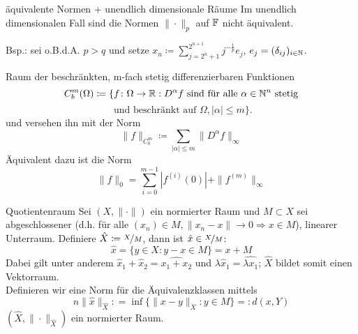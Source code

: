 	\begin{karte}{äquivalente Normen + unendlich dimensionale Räume}
		Im unendlich dimensionalen Fall sind die Normen $\| \cdot \|_{p}$ auf $\mathbb{F}$ nicht äquivalent.
		
		Bsp.: sei o.B.d.A. $p > q$ und setze $x_{n} \coloneqq \sum_{j = 2^{n} + 1}^{2^{n + 1}} j^{-\frac{1}{p}}e_{j}$, $e_{j} = ( \delta_{ij} )_{i \in \mathbb{N}}$. \\
	\end{karte}
	
	\begin{karte}{Raum der beschränkten, m-fach stetig differenzierbaren Funktionen}	
		\[ C_{b}^{m}(\Omega) \coloneqq \{ f \colon \Omega \rightarrow \mathbb{R} : D^{\alpha}f \text{ sind für alle } \alpha \in \mathbb{N}^{n} \text{ stetig} \] \[ \text{ und beschränkt auf } \Omega, |\alpha| \leq m \}. \]	
		und versehen ihn mit der Norm 
			\[ \| f \|_{C_{b}^{m}} \coloneqq \sum_{|\alpha| \leq m} \| D^{\alpha}f \|_{\infty} \]
		Äquivalent dazu ist die Norm
		\[ \| f \|_{0} = \sum_{i = 0}^{m - 1} |f^{(i)}(0)| + \| f^{(m)} \|_{\infty} \]
	\end{karte}
	
	\begin{karte}{Quotientenraum}		
	Sei $(X, \| \cdot \|)$ ein normierter Raum und $M \subset X$ sei abgeschlossener (d.h. für alle $(x_{n}) \in M, \| x_{n} - x \| \rightarrow 0 \Rightarrow x \in M$), linearer Unterraum.
	Definiere $\hat X \coloneqq \nicefrac{X}{M}$, dann ist $\hat x \in \nicefrac{X}{M}$:
		\[ \hat x = \{ y \in X: y - x \in M \} = x + M \]
	Dabei gilt unter anderem $\hat x_{1} + \hat x_{2} = \widehat{x_{1} + x_{2}}$ und $\lambda \hat x_{1} = \widehat{\lambda x_{1}}$; $\hat X$ bildet somit einen Vektorraum. \\
	Definieren wir eine Norm für die Äquivalenzklassen mittels
		\[n\| \hat x \|_{\hat X} : = \inf \{ \| x - y \|_{X}: y \in M \} =: d(x, Y) \]
	$(\hat X, \| \cdot \|_{\hat X})$ ein normierter Raum.
	\end{karte}